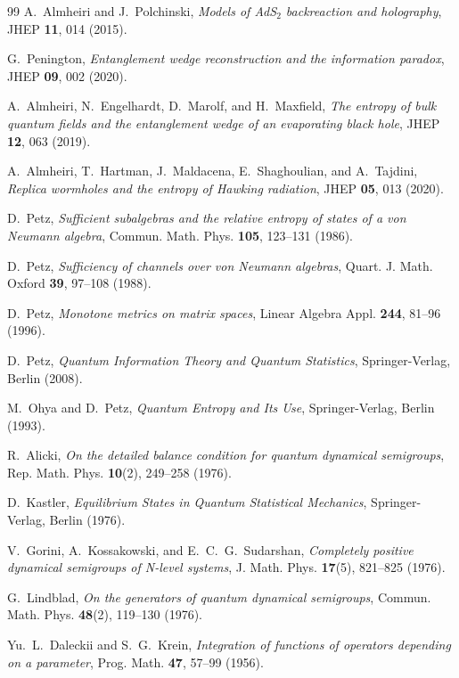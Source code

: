 \documentclass[11pt,a4paper]{article}
\theoremstyle{plain}
\theoremstyle{definition}
\begin{document}
\begin{thebibliography}{99}
A.~Almheiri and J.~Polchinski, \textit{Models of AdS$_2$ backreaction and holography}, JHEP \textbf{11}, 014 (2015).

G.~Penington, \textit{Entanglement wedge reconstruction and the information paradox}, JHEP \textbf{09}, 002 (2020).

A.~Almheiri, N.~Engelhardt, D.~Marolf, and H.~Maxfield, \textit{The entropy of bulk quantum fields and the entanglement wedge of an evaporating black hole}, JHEP \textbf{12}, 063 (2019).

A.~Almheiri, T.~Hartman, J.~Maldacena, E.~Shaghoulian, and A.~Tajdini, \textit{Replica wormholes and the entropy of Hawking radiation}, JHEP \textbf{05}, 013 (2020).

D.~Petz, \textit{Sufficient subalgebras and the relative entropy of states of a von Neumann algebra}, Commun. Math. Phys. \textbf{105}, 123--131 (1986).

D.~Petz, \textit{Sufficiency of channels over von Neumann algebras}, Quart. J. Math. Oxford \textbf{39}, 97--108 (1988).

D.~Petz, \textit{Monotone metrics on matrix spaces}, Linear Algebra Appl. \textbf{244}, 81--96 (1996).

D.~Petz, \textit{Quantum Information Theory and Quantum Statistics}, Springer-Verlag, Berlin (2008).

M.~Ohya and D.~Petz, \textit{Quantum Entropy and Its Use}, Springer-Verlag, Berlin (1993).

R.~Alicki, \textit{On the detailed balance condition for quantum dynamical semigroups}, Rep. Math. Phys. \textbf{10}(2), 249--258 (1976).

D.~Kastler, \textit{Equilibrium States in Quantum Statistical Mechanics}, Springer-Verlag, Berlin (1976).

V.~Gorini, A.~Kossakowski, and E.~C.~G.~Sudarshan, \textit{Completely positive dynamical semigroups of N-level systems}, J. Math. Phys. \textbf{17}(5), 821--825 (1976).

G.~Lindblad, \textit{On the generators of quantum dynamical semigroups}, Commun. Math. Phys. \textbf{48}(2), 119--130 (1976).

Yu.~L.~Daleckii and S.~G.~Krein, \textit{Integration of functions of operators depending on a parameter}, Prog. Math. \textbf{47}, 57--99 (1956).


\end{thebibliography}
\end{document}
